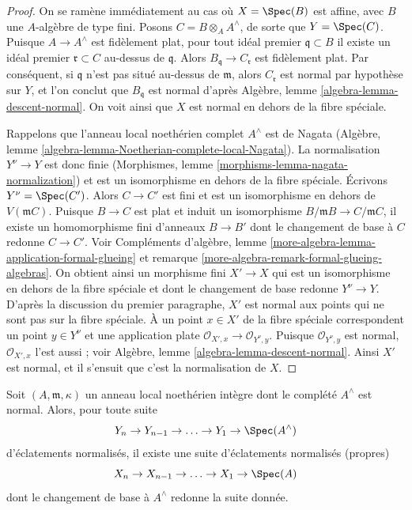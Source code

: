 \begin{proof} On se ramène immédiatement au cas où $X = \Spec(B)$ est affine, avec $B$ une $A$-algèbre de type fini. Posons $C = B \otimes_A A^\wedge$, de sorte que $Y = \Spec(C)$. Puisque $A \to A^\wedge$ est fidèlement plat, pour tout idéal premier $\mathfrak q \subset B$ il existe un idéal premier $\mathfrak r \subset C$ au-dessus de $\mathfrak q$. Alors $B_\mathfrak q \to C_\mathfrak r$ est fidèlement plat. Par conséquent, si $\mathfrak q$ n'est pas situé au-dessus de $\mathfrak m$, alors $C_\mathfrak r$ est normal par hypothèse sur $Y$, et l'on conclut que $B_\mathfrak q$ est normal d'après Algèbre, lemme \ref{algebra-lemma-descent-normal}. On voit ainsi que $X$ est normal en dehors de la fibre spéciale.

\medskip\noindent Rappelons que l'anneau local noethérien complet $A^\wedge$ est de Nagata (Algèbre, lemme \ref{algebra-lemma-Noetherian-complete-local-Nagata}). La normalisation $Y^\nu \to Y$ est donc finie (Morphismes, lemme \ref{morphisms-lemma-nagata-normalization}) et est un isomorphisme en dehors de la fibre spéciale. Écrivons $Y^\nu = \Spec(C')$. Alors $C \to C'$ est fini et est un isomorphisme en dehors de $V(\mathfrak m C)$. Puisque $B \to C$ est plat et induit un isomorphisme $B/\mathfrak m B \to C/\mathfrak m C$, il existe un homomorphisme fini d'anneaux $B \to B'$ dont le changement de base à $C$ redonne $C \to C'$. Voir Compléments d'algèbre, lemme \ref{more-algebra-lemma-application-formal-glueing} et remarque \ref{more-algebra-remark-formal-glueing-algebras}. On obtient ainsi un morphisme fini $X' \to X$ qui est un isomorphisme en dehors de la fibre spéciale et dont le changement de base redonne $Y^\nu \to Y$. D'après la discussion du premier paragraphe, $X'$ est normal aux points qui ne sont pas sur la fibre spéciale. À un point $x \in X'$ de la fibre spéciale correspondent un point $y \in Y^\nu$ et une application plate $\mathcal{O}_{X', x} \to \mathcal{O}_{Y^\nu, y}$. Puisque $\mathcal{O}_{Y^\nu, y}$ est normal, $\mathcal{O}_{X', x}$ l'est aussi ; voir Algèbre, lemme \ref{algebra-lemma-descent-normal}. Ainsi $X'$ est normal, et il s'ensuit que c'est la normalisation de $X$. \end{proof}

\begin{lemma} \label{lemma-normalized-blowup-completion} Soit $(A, \mathfrak m, \kappa)$ un anneau local noethérien intègre dont le complété $A^\wedge$ est normal. Alors, pour toute suite $$
Y_n \to Y_{n - 1} \to \ldots \to Y_1 \to \Spec(A^\wedge)
$$ d'éclatements normalisés, il existe une suite d'éclatements normalisés (propres) $$
X_n \to X_{n - 1} \to \ldots \to X_1 \to \Spec(A)
$$ dont le changement de base à $A^\wedge$ redonne la suite donnée. \end{lemma}

